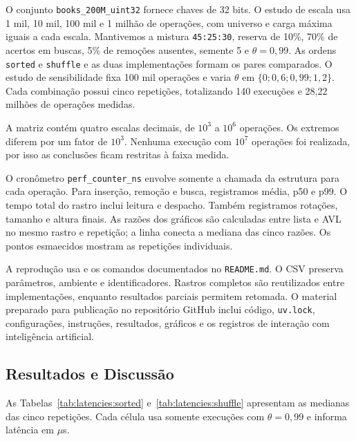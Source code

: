 \documentclass[12pt]{article}
\begin{document}
{O conjunto \texttt{books\_200M\_uint32} fornece chaves de 32 bits. O estudo de escala usa 1 mil, 10 mil, 100 mil e 1 milhão de operações, com universo e carga máxima iguais a cada escala. Mantivemos a mistura \texttt{45:25:30}, reserva de 10\%, 70\% de acertos em buscas, 5\% de remoções ausentes, semente 5 e $\theta=0{,}99$. As ordens \texttt{sorted} e \texttt{shuffle} e as duas implementações formam os pares comparados. O estudo de sensibilidade fixa 100 mil operações e varia $\theta$ em $\{0; 0{,}6; 0{,}99; 1{,}2\}$. Cada combinação possui cinco repetições, totalizando 140 execuções e 28,22 milhões de operações medidas.}

{A matriz contém quatro escalas decimais, de $10^3$ a $10^6$ operações. Os extremos diferem por um fator de $10^3$. Nenhuma execução com $10^7$ operações foi realizada, por isso as conclusões ficam restritas à faixa medida.}

{O cronômetro \texttt{perf\_counter\_ns} envolve somente a chamada da estrutura para cada operação. Para inserção, remoção e busca, registramos média, p50 e p99. O tempo total do rastro inclui leitura e despacho. Também registramos rotações, tamanho e altura finais. As razões dos gráficos são calculadas entre lista e AVL no mesmo rastro e repetição; a linha conecta a mediana das cinco razões. Os pontos esmaecidos mostram as repetições individuais.}

{A reprodução usa  e os comandos documentados no \texttt{README.md}. O CSV preserva parâmetros, ambiente e identificadores. Rastros completos são reutilizados entre implementações, enquanto resultados parciais permitem retomada. O material preparado para publicação no repositório GitHub inclui código, \texttt{uv.lock}, configurações, instruções, resultados, gráficos e os registros de interação com inteligência artificial.}

\subsection{{Resultados e Discussão}}\label{sec:experiments:results}

{As Tabelas~\ref{tab:latencies:sorted} e~\ref{tab:latencies:shuffle} apresentam as medianas das cinco repetições. Cada célula usa somente execuções com $\theta=0{,}99$ e informa latência em $\mu$s.}
\end{document}
